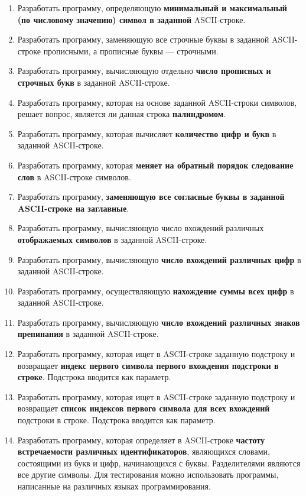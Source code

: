 \begin{enumerate}
    \item Разработать программу, определяющую \textbf{минимальный и максимальный (по числовому значению) символ в заданной} ASCII-строке.
    \item Разработать программу, заменяющую все строчные буквы в заданной ASCII-строке прописными, а прописные буквы --- строчными.
    \item Разработать программу, вычисляющую отдельно \textbf{число прописных и строчных букв} в заданной ASCII-строке.
    \item Разработать программу, которая на основе заданной ASCII-строки символов, решает вопрос, является ли данная строка \textbf{палиндромом}.
    \item Разработать программу, которая вычисляет \textbf{количество цифр и букв} в заданной ASCII-строке.
    \item Разработать программу, которая \textbf{меняет на обратный порядок следование слов} в ASCII-строке символов.
    \item Разработать программу, \textbf{заменяющую все согласные буквы в заданной ASCII-строке на заглавные}.
    \item Разработать программу, вычисляющую число вхождений различных \textbf{отображаемых символов} в заданной ASCII-строке.
    \item Разработать программу, вычисляющую \textbf{число вхождений различных цифр} в заданной ASCII-строке.
    \item Разработать программу, осуществляющую \textbf{нахождение суммы всех цифр} в заданной ASCII-строке.
    \item Разработать программу, вычисляющую \textbf{число вхождений различных знаков препинания} в заданной ASCII-строке.
    \item Разработать программу, которая ищет в ASCII-строке заданную подстроку и возвращает \textbf{индекс первого символа первого вхождения подстроки в строке}. Подстрока вводится как параметр.
    \item Разработать программу, которая ищет в ASCII-строке заданную подстроку и возвращает \textbf{список индексов первого символа для всех вхождений} подстроки в строке. Подстрока вводится как параметр.
    \item Разработать программу, которая определяет в ASCII-строке \textbf{частоту встречаемости различных идентификаторов}, являющихся словами, состоящими из букв и цифр, начинающихся с буквы. Разделителями являются все другие символы. Для тестирования можно использовать программы, написанные на различных языках программирования.

\end{enumerate}
